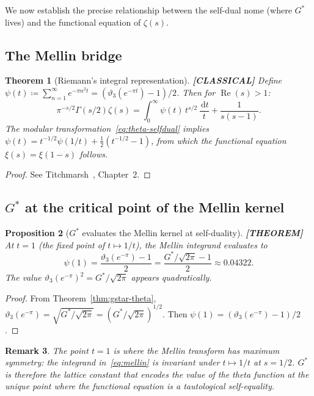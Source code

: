 \documentclass[11pt]{article}
\theoremstyle{tight}
\newtheorem{theorem}{Theorem}[section]
\newtheorem{proposition}[theorem]{Proposition}
\theoremstyle{plainroman}
\newtheorem{remark}[theorem]{Remark}
\newcommand{\dd}{\,\mathrm{d}}
\begin{document}
We now establish the precise relationship between the self-dual nome (where $G^*$ lives) and the functional equation of $\zeta(s)$.

\subsection{The Mellin bridge}

\begin{theorem}[Riemann's integral representation]\label{thm:mellin}
\textbf{[CLASSICAL]}
Define $\psi(t)\coloneqq\sum_{n=1}^\infty e^{-\pi n^2 t}=(\vartheta_3(e^{-\pi t})-1)/2$.
Then for $\operatorname{Re}(s)>1$:
\begin{equation}\label{eq:mellin}
\pi^{-s/2}\Gamma(s/2)\zeta(s)=\int_0^\infty \psi(t)\,t^{s/2}\,\frac{\dd t}{t}+\frac{1}{s(s-1)}.
\end{equation}
The modular transformation~\eqref{eq:theta-selfdual} implies $\psi(t)=t^{-1/2}\psi(1/t)+\frac{1}{2}(t^{-1/2}-1)$, from which the functional equation $\xi(s)=\xi(1-s)$ follows.
\end{theorem}
\begin{proof}
See Titchmarsh~\cite{titchmarsh}, Chapter~2.
\end{proof}

\subsection{$G^*$ at the critical point of the Mellin kernel}

\begin{proposition}[$G^*$ evaluates the Mellin kernel at self-duality]\label{prop:mellin-gstar}
\textbf{[THEOREM]}
At $t=1$ (the fixed point of $t\mapsto 1/t$), the Mellin integrand evaluates to
\[
\psi(1)=\frac{\vartheta_3(e^{-\pi})-1}{2}=\frac{G^*/\sqrt{2\pi}-1}{2}\approx 0.04322.
\]
The value $\vartheta_3(e^{-\pi})^2=G^*/\sqrt{2\pi}$ appears quadratically.
\end{proposition}
\begin{proof}
From Theorem~\ref{thm:gstar-theta}, $\vartheta_3(e^{-\pi})=\sqrt{G^*/\sqrt{2\pi}}=(G^*/\sqrt{2\pi})^{1/2}$.
Then $\psi(1)=(\vartheta_3(e^{-\pi})-1)/2$.
\end{proof}

\begin{remark}
The point $t=1$ is where the Mellin transform has maximum symmetry: the integrand in~\eqref{eq:mellin} is invariant under $t\mapsto 1/t$ at $s=1/2$.
$G^*$ is therefore the lattice constant that encodes the value of the theta function at the \emph{unique} point where the functional equation is a tautological self-equality.
\end{remark}
\end{document}
